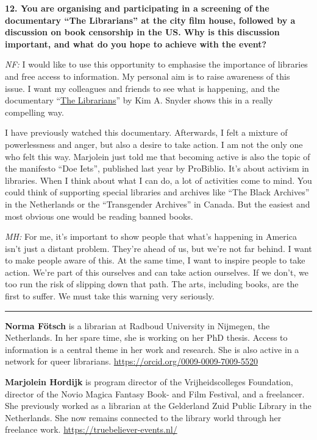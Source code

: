 \documentclass[a4paper,
fontsize=11pt,
oneside,
numbers=noperiodatend,
parskip=half-,
bibliography=totoc,
final
]{scrartcl}
\begin{document}
\textbf{12. You are organising and participating in a screening of the
documentary \enquote{The Librarians} at the city film house, followed by
a discussion on book censorship in the US. Why is this discussion
important, and what do you hope to achieve with the event?}

\emph{NF:} I would like to use this opportunity to emphasise the
importance of libraries and free access to information. My personal aim
is to raise awareness of this issue. I want my colleagues and friends to
see what is happening, and the documentary
\enquote{\href{https://thelibrariansfilm.com/}{The Librarians}} by Kim
A. Snyder shows this in a really compelling way.

I have previously watched this documentary. Afterwards, I felt a mixture
of powerlessness and anger, but also a desire to take action. I am not
the only one who felt this way. Marjolein just told me that becoming
active is also the topic of the manifesto \enquote{Doe Iets}, published
last year by ProBiblio. It's about activism in
libraries. When I think about what I can do, a lot of activities come to
mind. You could think of supporting special libraries and archives like
\enquote{The Black Archives} in the Netherlands or the
\enquote{Transgender Archives} in Canada. But the easiest and most
obvious one would be reading banned books.

\emph{MH:} For me, it's important to show people that what's happening
in America isn't just a distant problem. They're ahead of us, but we're
not far behind. I want to make people aware of this. At the same time, I
want to inspire people to take action. We're part of this ourselves and
can take action ourselves. If we don't, we too run the risk of slipping
down that path. The arts, including books, are the first to suffer. We
must take this warning very seriously.

\begin{center}\rule{0.5\linewidth}{0.5pt}\end{center}

\textbf{Norma Fötsch} is a
librarian at Radboud University in Nijmegen, the Netherlands. In her
spare time, she is working on her PhD thesis. Access to information is a
central theme in her work and research. She is also active in a network
for queer librarians.\newline
\url{https://orcid.org/0009-0009-7009-5520}

\textbf{Marjolein Hordijk} is program director of the Vrijheidscolleges
Foundation, director of the Novio Magica Fantasy Book- and Film
Festival, and a freelancer. She previously worked as a librarian at the
Gelderland Zuid Public Library in the Netherlands. She now remains
connected to the library world through her freelance work.\newline
\url{https://truebeliever-events.nl/}
\end{document}
